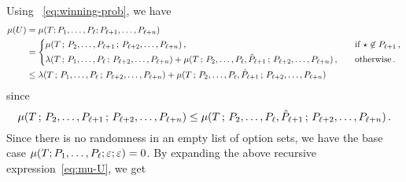     Using ~\eqref{eq:winning-prob}, we have
    \begin{align}
        \mu(U)
        &= \mu(T; P_1, \ldots, P_\ell; P_{\ell+1}, \ldots, P_{\ell+n}) \nonumber \\
        &= \begin{dcases}
            \mu(T\,;\,P_2, \ldots, P_{\ell+1} \,;\, P_{\ell+{2}}, \ldots, P_{\ell + n})\,,
                &\quad\text{if $\star \not \in P_{\ell + 1}$}\,,
                \\
            \lambda(T\,;\,P_{1}, \ldots, P_{\ell}\,;\, P_{\ell+{2}}, \ldots, P_{\ell + n}) 
            + \mu(T\,;\,P_{2}, \ldots, P_{\ell}, \hat{P}_{\ell + 1} \,;\, P_{\ell+{2}}, \ldots, P_{\ell + n})\,,
                &\quad\text{otherwise}
            \,.
        \end{dcases} \nonumber \\
        &\leq 
            \lambda(T\,;\,P_{1}, \ldots, P_{\ell}\,;\, P_{\ell+{2}}, \ldots, P_{\ell + n}) 
            + \mu(T\,;\,P_{2}, \ldots, P_{\ell}, \hat{P}_{\ell + 1} \,;\, P_{\ell+{2}}, \ldots, P_{\ell + n})
            \label{eq:mu-U}
    \end{align}
    since $$
    \mu(T\,;\,P_2, \ldots, P_{\ell+1} \,;\, P_{\ell+{2}}, \ldots, P_{\ell + n}) 
    \leq 
    \mu(T\,;\,P_{2}, \ldots, P_{\ell}, \hat{P}_{\ell + 1} \,;\, P_{\ell+{2}}, \ldots, P_{\ell + n})
    \,.
    $$
    Since there is no randomness in an empty list of option sets, 
    we have the base case 
    $\mu(T; P_1, \ldots, P_\ell; \varepsilon; \varepsilon) = 0$.
    By expanding the above recursive expression~\eqref{eq:mu-U}, we get 
